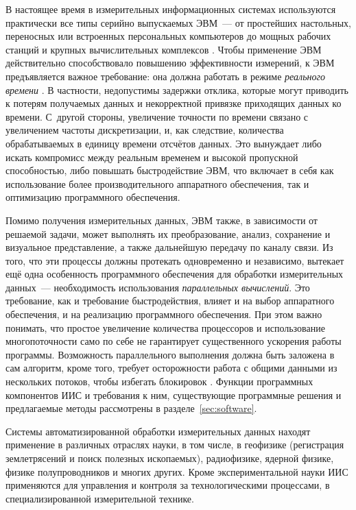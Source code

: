 \documentclass[a4paper, 14pt, titlepage]{extarticle}
\newcommand{\term}[1]{\emph{#1}}
\begin{document}
  В настоящее время в измерительных информационных системах используются практически все типы
  серийно выпускаемых ЭВМ~--- от простейших настольных, переносных или встроенных персональных
  компьютеров до мощных рабочих станций и крупных вычислительных комплексов \cite[с.~149]{rannev-iis}.
  Чтобы применение ЭВМ действительно способствовало повышению эффективности измерений, к ЭВМ
  предъявляется важное требование: она должна работать в режиме \term{реального времени}
  \cite{tessier-reconfigurable}. В частности, недопустимы задержки отклика, которые могут приводить
  к потерям получаемых данных и некорректной привязке приходящих данных ко времени. С~другой
  стороны, увеличение точности по времени связано с увеличением частоты дискретизации, и, как
  следствие, количества обрабатываемых в единицу времени отсчётов данных. Это вынуждает либо искать
  компромисс между реальным временем и высокой пропускной способностью, либо повышать быстродействие
  ЭВМ, что включает в себя как использование более производительного аппаратного обеспечения, так и
  оптимизацию программного обеспечения.

  Помимо получения измерительных данных, ЭВМ также, в зависимости от решаемой задачи, может
  выполнять их преобразование, анализ, сохранение и визуальное представление, а также дальнейшую
  передачу по каналу связи. Из того, что эти процессы должны протекать одновременно и независимо,
  вытекает ещё одна особенность программного обеспечения для обработки измерительных данных~---
  необходимость использования \term{параллельных вычислений}. Это требование, как и требование
  быстродействия, влияет и на выбор аппаратного обеспечения, и на реализацию программного обеспечения.
  При этом важно понимать, что простое увеличение количества процессоров и использование
  многопоточности само по себе не гарантирует существенного ускорения работы программы. Возможность
  параллельного выполнения должна быть заложена в сам алгоритм, кроме того, требует осторожности
  работа с общими данными из нескольких потоков, чтобы избегать блокировок \cite{hoare-csp}.
  Функции программных компонентов ИИС и требования к ним, существующие программные решения и
  предлагаемые методы рассмотрены в разделе~\ref{sec:software}.

  Системы автоматизированной обработки измерительных данных находят применение в различных отраслях науки,
  в том числе, в геофизике (регистрация землетрясений и поиск полезных ископаемых), радиофизике,
  ядерной физике, физике полупроводников и многих других. Кроме экспериментальной науки ИИС
  применяются для управления и контроля за технологическими процессами, в специализированной
  измерительной технике.
\end{document}
